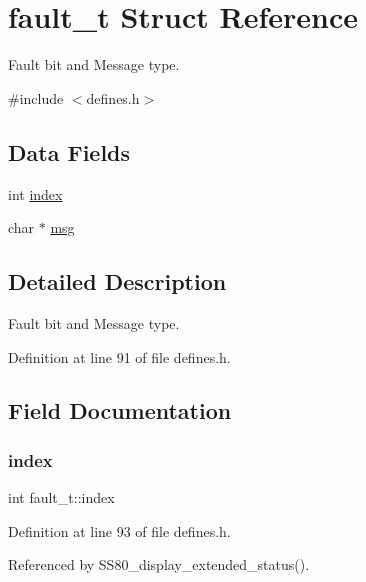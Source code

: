\hypertarget{structfault__t}{}\section{fault\+\_\+t Struct Reference}
\label{structfault__t}


Fault bit and Message type.  




{\ttfamily \#include $<$defines.\+h$>$}

\subsection*{Data Fields}
\begin{DoxyCompactItemize}
\item 
int \hyperlink{structfault__t_a540c9496df912b65e22c50b6a40535ef}{index}
\item 
char $\ast$ \hyperlink{structfault__t_a9037306efc26edf60b59bc1ee6843c69}{msg}
\end{DoxyCompactItemize}


\subsection{Detailed Description}
Fault bit and Message type. 

Definition at line 91 of file defines.\+h.



\subsection{Field Documentation}
\mbox{\label{structfault__t_a540c9496df912b65e22c50b6a40535ef}} 
\subsubsection{\texorpdfstring{index}{index}}
{\footnotesize\ttfamily int fault\+\_\+t\+::index}



Definition at line 93 of file defines.\+h.



Referenced by S\+S80\+\_\+display\+\_\+extended\+\_\+status().

\mbox{\label{structfault__t_a9037306efc26edf60b59bc1ee6843c69}} 
